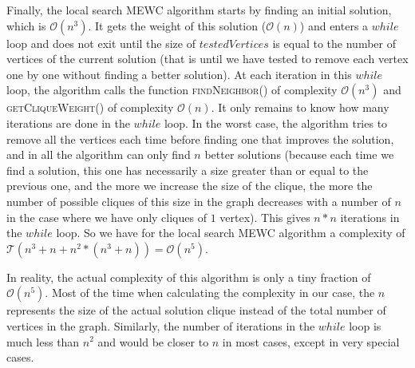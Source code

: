 Finally, the local search MEWC algorithm starts by finding an initial solution, which is 
$\mathcal{O}(n^3)$. It gets the weight of this solution ($\mathcal{O}(n)$) and enters a $while$ 
loop and does not exit until the size of $testedVertices$ is equal to the number of vertices of 
the current solution (that is until we have tested to remove each vertex one by one without finding 
a better solution). At each iteration in this $while$ loop, the algorithm calls the function 
\textsc{findNeighbor()} of complexity $\mathcal{O}(n^3)$ and \textsc{getCliqueWeight()} of complexity 
$\mathcal{O}(n)$. It only remains to know how many iterations are done in the $while$ loop. In the 
worst case, the algorithm tries to remove all the vertices each time before finding one that improves 
the solution, and in all the algorithm can only find $n$ better solutions (because each time we find 
a solution, this one has necessarily a size greater than or equal to the previous one, and the more 
we increase the size of the clique, the more the number of possible cliques of this size in the 
graph decreases with a number of $n$ in the case where we have only cliques of $1$ vertex). This 
gives $n*n$ iterations in the $while$ loop. So we have for the local search MEWC algorithm a 
complexity of $\mathcal{T}(n^3 + n + n^2*(n^3 + n)) = \mathcal{O}(n^5)$.
\bigskip

In reality, the actual complexity of this algorithm is only a tiny fraction of $\mathcal{O}(n^5)$. 
Most of the time when calculating the complexity in our case, the $n$ represents the size of the 
actual solution clique instead of the total number of vertices in the graph. Similarly, the number 
of iterations in the $while$ loop is much less than $n^2$ and would be closer to $n$ in most cases, 
except in very special cases.